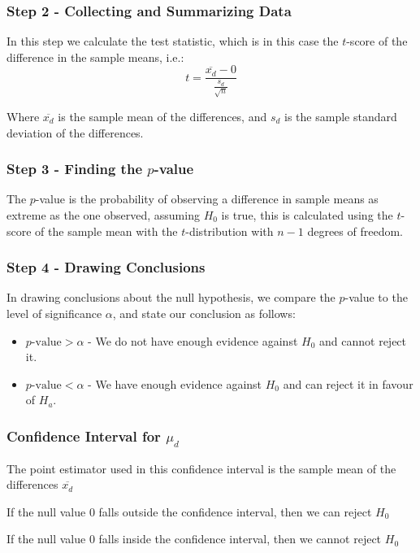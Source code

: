 \documentclass[12pt letter]{report}
\begin{document}
\subsubsection{Step 2 - Collecting and Summarizing Data}

In this step we calculate the test statistic, which is in this case the $t$-score of the difference in the sample means,
i.e.:
\[
  t = \frac{\overline{x_d} - 0}{\frac{s_d}{\sqrt{n}}}
\]

Where $\overline{x_d}$ is the sample mean of the differences, and $s_d$ is the sample standard deviation of the differences.

\subsubsection{Step 3 - Finding the $p$-value}

The $p$-value is the probability of observing a difference in sample means as extreme as the one observed, assuming
$H_0$ is true, this is calculated using the $t$-score of the sample mean with the $t$-distribution with $n-1$ degrees of
freedom.

\subsubsection{Step 4 - Drawing Conclusions}

In drawing conclusions about the null hypothesis, we compare the $p$-value to the level of significance $\alpha $, and
state our conclusion as follows:
\begin{itemize}
  \item $p\text{-value} > \alpha$ - We do not have enough evidence against $H_0$ and cannot reject it.
  \item $p\text{-value} < \alpha$ - We have enough evidence against $H_0$ and can reject it in favour of $H_a$.
\end{itemize}

\subsubsection{Confidence Interval for $\mu_d$}

The point estimator used in this confidence interval is the sample mean of the differences $\overline{x_d}$

If the null value $0$ falls outside the confidence interval, then we can reject $H_0$

If the null value $0$ falls inside the confidence interval, then we cannot reject $H_0$
\end{document}
